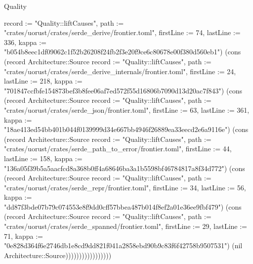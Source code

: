 \begin{lexlean}{Quality}
\begin{semanticmodule}
{{record := "Quality::liftCauses", path := "crates/uorust/crates/serde_derive/frontier.toml", firstLine := 74, lastLine := 336, kappa := "b054b8eec1df09062c1f52b26208f24fb2f3e20f9ce6c80678e00f380d560eb1"}) (cons (record Architecture::Source {record := "Quality::liftCauses", path := "crates/uorust/crates/serde_derive_internals/frontier.toml", firstLine := 24, lastLine := 218, kappa := "701847ccfbfe154873bef3b8fee06af7ed572f55d16806b7090d13d20ac7f843"}) (cons (record Architecture::Source {record := "Quality::liftCauses", path := "crates/uorust/crates/serde_json/frontier.toml", firstLine := 63, lastLine := 361, kappa := "18ae413ed54bb401b044f0139999d34e667bb4946f26889ea33eecd2e6a9116e"}) (cons (record Architecture::Source {record := "Quality::liftCauses", path := "crates/uorust/crates/serde_path_to_error/frontier.toml", firstLine := 44, lastLine := 158, kappa := "136a05f39b5a5aacfcd8a368b0ff4a68646ba3a1b5598bf46784817a8f34d772"}) (cons (record Architecture::Source {record := "Quality::liftCauses", path := "crates/uorust/crates/serde_repr/frontier.toml", firstLine := 34, lastLine := 56, kappa := "dd87f3bde07b79c074553e8f9dd0cff57bbea487b014f8ef2a01e36ee9fbf479"}) (cons (record Architecture::Source {record := "Quality::liftCauses", path := "crates/uorust/crates/serde_spanned/frontier.toml", firstLine := 29, lastLine := 71, kappa := "0e828d364f6e2746db1e8cd9dd821f041a2858ebd90b9c83f6f42758b9507531"}) (nil Architecture::Source)))))))))))))))))
}


\end{semanticmodule}
\end{lexlean}
